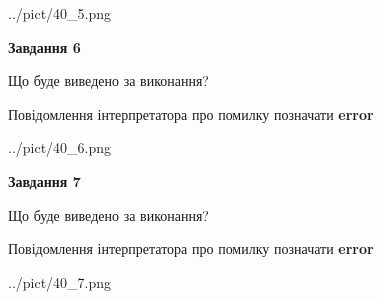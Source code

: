 \documentclass[10pt, ukrainian]{article}
\begin{document}
{\begin {large}
\begin{center}
	{../pict/40_5.png}
\end{center}
\newpage

{\begin {center}\textbf{Завдання 6}\end {center}}\par
Що буде виведено за виконання? \par
Повідомлення інтерпретатора про помилку позначати \textbf{error}

\begin{center}
	{../pict/40_6.png}
\end{center}
\newpage

{\begin {center}\textbf{Завдання 7}\end {center}}\par
Що буде виведено за виконання? \par
Повідомлення інтерпретатора про помилку позначати \textbf{error}

\begin{center}
	{../pict/40_7.png}
\end{center}
\newpage

\end {large}}
\end{document}

